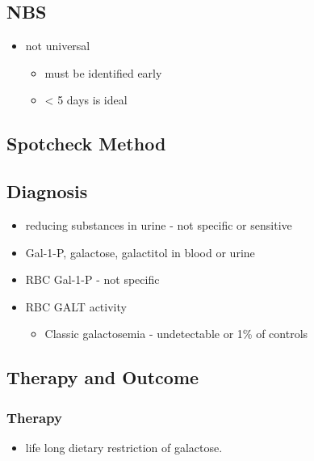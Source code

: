 \documentclass{scrartcl}
\begin{document}
\subsection{NBS}
\label{sec:org4a8b8c7}
\begin{itemize}
\item not universal
\begin{itemize}
\item must be identified early
\item \textless{} 5 days is ideal
\end{itemize}
\end{itemize}

\subsection{Spotcheck Method}
\label{sec:org45f8c2c}





\subsection{Diagnosis}
\label{sec:orgcf16610}
\begin{itemize}
\item reducing substances in urine - not specific or sensitive
\item Gal-1-P, galactose, galactitol in blood or urine
\item RBC Gal-1-P - not specific
\item RBC GALT activity
\begin{itemize}
\item Classic galactosemia - undetectable or 1\% of controls
\end{itemize}
\end{itemize}

\subsection{Therapy and Outcome}
\label{sec:org6309baf}

\subsubsection{Therapy}
\label{sec:orgdf924e4}
\begin{itemize}
\item life long dietary restriction of galactose.
\end{itemize}
\end{document}
